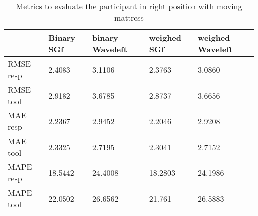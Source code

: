 \begin{table}\begin{tabular}{|lllll|}
\hline 
& Binary SGf & binary Waveleft & weighed  SGf & weighed Waveleft \\ 

\hline 
RMSE resp &
     2.4083   & 3.1106  &  2.3763 &   3.0860 \\
RMSE  tool &    2.9182  &  3.6785   & 2.8737  &  3.6656 \\
MAE resp & 2.2367 &   2.9452 &     2.2046 &  2.9208 \\ 
MAE tool &     2.3325 & 2.7195 & 2.3041 &  2.7152 \\
MAPE resp & 18.5442 & 24.4008 & 18.2803 & 24.1986 \\ 
MAPE tool & 22.0502 & 26.6562 & 21.761 & 26.5883 \\ 
\hline 
\end{tabular}

\caption{Metrics to evaluate the participant in right position with moving mattress}
\end{table}
